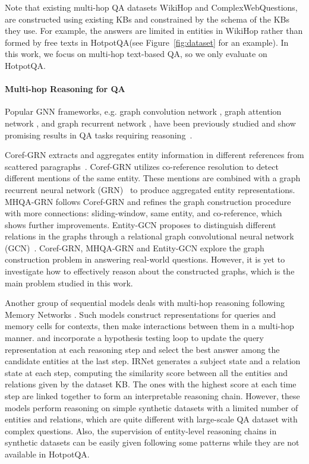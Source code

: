 \documentclass[11pt,a4paper]{article}
\newcommand{\hotpotqa}{HotpotQA\xspace}
\begin{document}
Note that existing multi-hop QA datasets WikiHop and ComplexWebQuestions, are constructed using existing KBs and constrained by the schema of the KBs they use. For example, the answers are limited in entities in WikiHop rather than formed by free texts in \hotpotqa (see Figure~\ref{fig:dataset} for an example). In this work, we focus on multi-hop text-based QA, so we only evaluate on \hotpotqa. 



\paragraph{Multi-hop Reasoning for QA}
Popular GNN frameworks, e.g. graph convolution network \cite{kipf2016semi}, graph attention network \cite{velivckovic2017graph}, and graph recurrent network \cite{song2018graph}, have been previously studied and show promising results in QA tasks requiring reasoning~\cite{dhingra2018neural,de2018question,song2018exploring}.

Coref-GRN extracts and aggregates entity information in different references from scattered paragraphs~\cite{dhingra2018neural}. 
Coref-GRN utilizes co-reference resolution to detect different mentions of the same entity. 
These mentions are combined with a graph recurrent neural network (GRN)~\cite{song2018graph} to produce aggregated entity representations. 
MHQA-GRN \cite{song2018exploring} follows Coref-GRN and refines the graph construction procedure with more connections: sliding-window, same entity, and co-reference, which shows further improvements. 
Entity-GCN \cite{de2018question} proposes to distinguish different relations in the graphs through a relational graph convolutional neural network (GCN)~\cite{kipf2016semi}.
Coref-GRN, MHQA-GRN and Entity-GCN explore the graph construction problem in answering real-world questions. 
However, it is yet to investigate how to effectively reason about the constructed graphs, which is the main problem studied in this work.

Another group of sequential models deals with multi-hop reasoning following Memory Networks \cite{sukhbaatar2015end}. 
Such models construct representations for queries and memory cells for contexts, then make interactions between them in a multi-hop manner.  and  incorporate a hypothesis testing loop to update the query representation at each reasoning step and select the best answer among the candidate entities at the last step. 
IRNet \cite{zhou2018interpretable} generates a subject state and a relation state at each step, computing the similarity score between all the entities and relations given by the dataset KB. 
The ones with the highest score at each time step are linked together to form an interpretable reasoning chain. 
However, these models perform reasoning on simple synthetic datasets with a limited number of entities and relations, which are quite different with large-scale QA dataset with complex questions.
Also, the supervision of entity-level reasoning chains in synthetic datasets can be easily given following some patterns while they are not available in \hotpotqa.  
\end{document}
